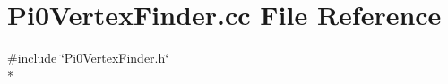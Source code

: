 \section{Pi0\-Vertex\-Finder.\-cc File Reference}
\label{Pi0VertexFinder_8cc}
{\ttfamily \#include \char`\"{}Pi0\-Vertex\-Finder.\-h\char`\"{}}\\*
